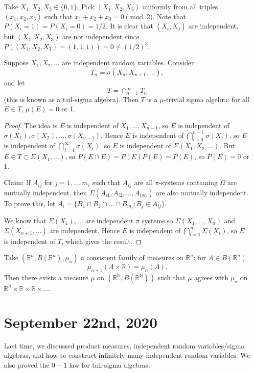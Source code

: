 \documentclass[11pt]{scrartcl}
\newcommand{\N}{\mathbb{N}}
\newcommand{\R}{\mathbb{R}}
\begin{document}
\begin{example}  Take $X_1, X_2, X_3 \in \{0, 1\}$,  Pick $(X_1, X_2, X_3)$ uniformly from all triples $(x_1, x_2, x_3)$ such that $x_1 + x_2 + x_3 = 0 \pmod 2$.  Note that $P(X_i = 1) = P(X_i = 0) = 1/2$.  It is clear that $(X_i, X_j)$ are independent, but $(X_1, X_2, X_3)$ are not independent since $P((X_1, X_2, X_3) = (1, 1, 1)) = 0 \ne (1/2)^3$.
 \end{example}
\begin{thm}
 Suppose $X_1, X_2, \dots$ are independent random variables.  Consider $$T_n = \sigma(X_n, X_{n+1}, \dots),$$
 and let $$T = \cap_{n=1}^{\infty} T_n$$
 (this is known as a tail-sigma algebra).  Then $T$ is a $\mu$-trivial sigma algebra: for all $E \in T$, $\mu(E) = 0$ or $1$.
 \end{thm}
 \begin{proof}
 The idea is $E$ is independent of $X_1, \dots, X_{n-1}$, so $E$ is independent of $\sigma(X_1), \sigma(X_2), \dots, \sigma(X_{n-1})$.  Hence $E$ is independent of $\bigcap_{i=1}^{n-1}\sigma(X_i)$, so $E$ is independent of $\bigcap_{i=1}^{\infty} \sigma(X_i)$, so $E$ is independent of $\Sigma(X_1, X_2, \dots)$.  But $E \in T \subset \Sigma(X_1, \dots)$, so $P(E \cap E) = P(E)P(E) = P(E)$, so $P(E) = 0$ or $1$.
 
 Claim: If $A_{ij}$ for $j=1, \dots, m_i$ such that $A_{ij}$ are all $\pi$-systems containing $\Omega$ are mutually independent, then $\Sigma(A_{i1}, A_{i2}, \dots, A_{im_i})$ are also mutually independent.  To prove this, let $A_i = \{B_1 \cap B_2 \cap \dots \cap B_{m_i}:B_j \in A_{ij}\}$.
 
 We know that $\Sigma(X_1), \dots $ are independent $\pi$ systems,so $\Sigma(X_1, \dots, X_n)$ and $\Sigma(X_{n+1}, \dots)$ are independent.  Hence $E$ is independent of $\bigcap_{i=1}^\infty \Sigma(X_i)$, so $E$ is independent of $T$, which gives the result. 
 \end{proof}
\begin{thm} Take $(\R^n, B(\R^n), \mu_n)$ a consistent family of measures on $\R^n$: for $A \in B(\R^n)$
$$\mu_{n+1}(A \times \R) = \mu_n(A).$$
Then there exists a measure $\mu$ on $(\R^\N, B(\R^\N))$ such that $\mu$ agrees with $\mu_n$ on $\R^n \times \R \times \R \times \dots$.

\end{thm}
\pagebreak
\section{September 22nd, 2020}
Last time, we discussed product measures, independent random variables/sigma algebras, and how to construct infinitely many independent random variables.  We also proved the $0-1$ law for tail-sigma algebras.
\end{document}
